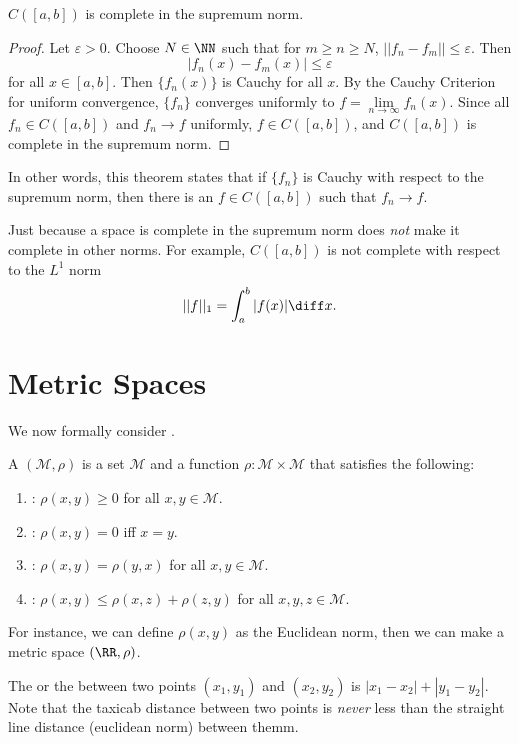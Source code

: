 \begin{theorem}
$C([a,b])$ is complete in the supremum norm. 
\end{theorem}
\begin{proof}
Let $\varepsilon > 0$. Choose $N \in \NN$ such that for $m \geq n \geq N$, $||f_n - f_m|| \leq \varepsilon$. Then 
\[ |f_n(x) - f_m(x)| \leq \varepsilon \] for all $x \in [a,b]$. Then $\{f_n(x)\}$ is Cauchy for all $x$. By the Cauchy Criterion for uniform convergence, $\{f_n\}$ converges uniformly to $f = \lim\limits_{n\to\infty} f_n(x)$. Since all $f_n \in C([a,b])$ and $f_n \to f$ uniformly, $f \in C([a,b])$, and $C([a,b])$ is complete in the supremum norm. 
\end{proof}
In other words, this theorem states that if $\{f_n\}$ is Cauchy with respect to the supremum norm, then there is an $f \in C([a,b])$ such that $f_n \to f$. 
\begin{remark}
Just because a space is complete in the supremum norm does \emph{not} make it complete in other norms. For example, $C([a,b])$ is not complete with respect to the $L^1$ norm
\[ ||f||_1 = \int_a^b |f(x)| \diff x. \] 
\end{remark}

\section{Metric Spaces}
We now formally consider . 
\begin{definition}
	A  $(\mathcal{M}, \rho)$ is a set $\mathcal{M}$ and a function $\rho : \mathcal{M} \times \mathcal{M}$ that satisfies the following: 
	\begin{enumerate}
		\item {}: $\rho(x,y) \geq 0$ for all $x, y \in \mathcal{M}$. 
		\item {}: $\rho(x,y) = 0$ iff $x = y$. 
		\item {}: $\rho(x,y) = \rho(y,x)$ for all $x,y \in \mathcal{M}$. 
		\item {}: $\rho(x,y) \leq \rho(x,z) + \rho(z,y)$ for all $x, y, z \in \mathcal{M}$. 
	\end{enumerate}
\end{definition}
For instance, we can define $\rho(x,y)$ as the Euclidean norm, then we can make a metric space $(\RR, \rho)$. 

\begin{definition}
	The  or the  between two points $(x_1, y_1)$ and $(x_2, y_2)$ is $|x_1 - x_2| + |y_1 - y_2|$. Note that the taxicab distance between two points is \emph{never} less than the straight line distance (euclidean norm) between themm. 
\end{definition}

